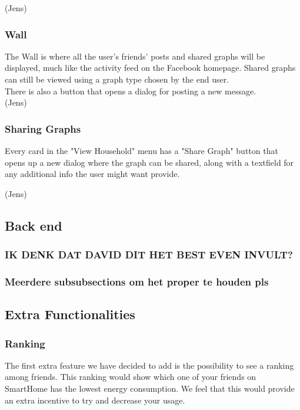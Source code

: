 \documentclass[11pt]{article}
\begin{document}
		(Jens)

	\subsubsection{Wall}
		The Wall is where all the user's friends' posts and shared graphs will be displayed,
		much like the activity feed on the Facebook homepage.
		Shared graphs can still be viewed using a graph type chosen by the end user.\\

		There is also a button that opens a dialog for posting a new message.\\

		(Jens)

	\subsubsection{Sharing Graphs}
		Every card in the "View Household" menu has a "Share Graph" button that opens up a new dialog where the graph can be shared,
		along with a textfield for any additional info the user might want provide.

		(Jens)
		
  \subsection{Back end}
	\subsubsection{IK DENK DAT DAVID DIT HET BEST EVEN INVULT?}
	\subsubsection{Meerdere subsubsections om het proper te houden pls}

  \subsection{Extra Functionalities}
	\subsubsection{Ranking}
		The first extra feature we have decided to add is the possibility to see a ranking among friends.
		This ranking would show which one of your friends on SmartHome has the lowest energy consumption.
		We feel that this would provide an extra incentive to try and decrease your usage.\\
\end{document}
